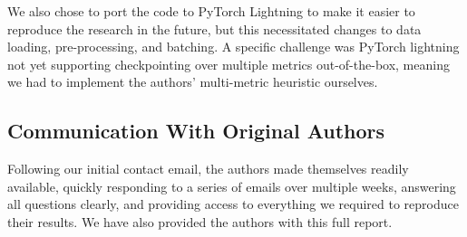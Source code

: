 We also chose to port the code to PyTorch Lightning to make it easier to reproduce the research in the future, but this necessitated changes to data loading, pre-processing, and batching. A specific challenge was PyTorch lightning not yet supporting checkpointing over multiple metrics out-of-the-box, meaning we had to implement the authors' multi-metric heuristic ourselves.

\subsection{Communication With Original Authors}

Following our initial contact email, the authors made themselves readily available, quickly responding to a series of emails over multiple weeks, answering all questions clearly, and providing access to everything we required to reproduce their results. We have also provided the authors with this full report.

\newpage


\newpage
